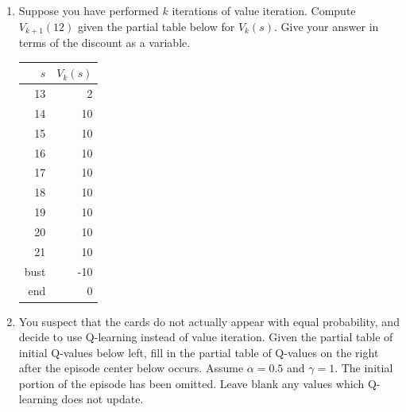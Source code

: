 \documentclass[12pt]{article}
\begin{document}
\begin{enumerate}

\item Suppose you have performed $k$ iterations of value iteration.
  Compute $V_{k+1}(12)$ given the partial table below for $V_k(s)$.
  Give your answer in terms of the discount as a variable.

\begin{center}
\begin{tabular}{|r|r|} \hline
$s$  & $V_k(s)$\\ \hline
13   &   2     \\
14   &  10     \\
15   &  10     \\
16   &  10     \\
17   &  10     \\
18   &  10     \\
19   &  10     \\
20   &  10     \\
21   &  10     \\
bust & -10     \\
end  &  0      \\ \hline
\end{tabular}
\end{center}

\item You suspect that the cards do not actually appear with equal
  probability, and decide to use Q-learning instead of value
  iteration.  Given the partial table of initial Q-values below left,
  fill in the partial table of Q-values on the right after the episode
  center below occurs.  Assume $\alpha=0.5$ and $\gamma=1$.  The
  initial portion of the episode has been omitted.  Leave blank any
  values which Q-learning does not update.


\end{enumerate}
\end{document}
